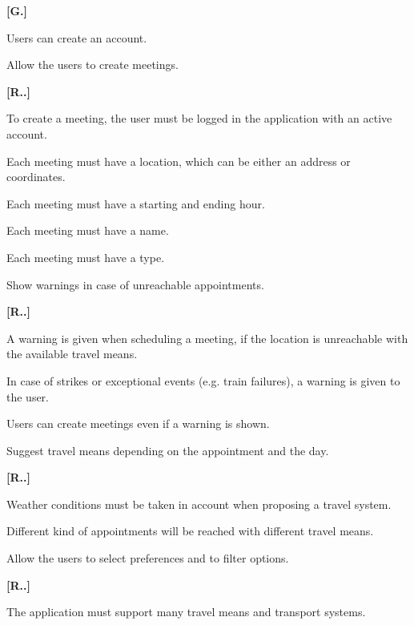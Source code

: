 \begin{list}
{\bfseries{}[G.]~}
{
}
	\item Users can create an account.
    \item Allow the users to create meetings.
	\begin{list}
	{\bfseries{}[R..]~}
	{
	}
        \item To create a meeting, the user must be logged in the application with an active account.
        \item Each meeting must have a location, which can be either an address or coordinates.
        \item Each meeting must have a starting and ending hour.
        \item Each meeting must have a name.
        \item Each meeting must have a type.
    \end{list}
    \item Show warnings in case of unreachable appointments.
    \begin{list}
	{\bfseries{}[R..]~}
	{
	}
        \item A warning is given when scheduling a meeting, if the location is unreachable with the available travel means.
        \item In case of strikes or exceptional events (e.g. train failures), a warning is given to the user. 
        \item Users can create meetings even if a warning is shown.
    \end{list}
    \item Suggest travel means depending on the appointment and the day.
    \begin{list}
	{\bfseries{}[R..]~}
	{
	}
        \item Weather conditions must be taken in account when proposing a travel system.
        \item Different kind of appointments will be reached with different travel means.
    \end{list}
    \item Allow the users to select preferences and to filter options.
    \begin{list}
	{\bfseries{}[R..]~}
	{
	}
        \item The application must support many travel means and transport systems.

\end{list}
\end{list}
